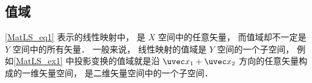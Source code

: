 \subsection{值域}
\autoref{MatLS_eq1} 表示的线性映射中， 是 $X$ 空间中的任意矢量， 而值域却不一定是 $Y$ 空间中的所有矢量． 一般来说， 线性映射的值域是 $Y$ 空间的一个子空间， 例如\autoref{MatLS_ex1} 中投影变换的值域就是沿 $\uvec x_1 + \uvec x_2$ 方向的任意矢量构成的一维矢量空间， 是二维矢量空间中的一个子空间．


